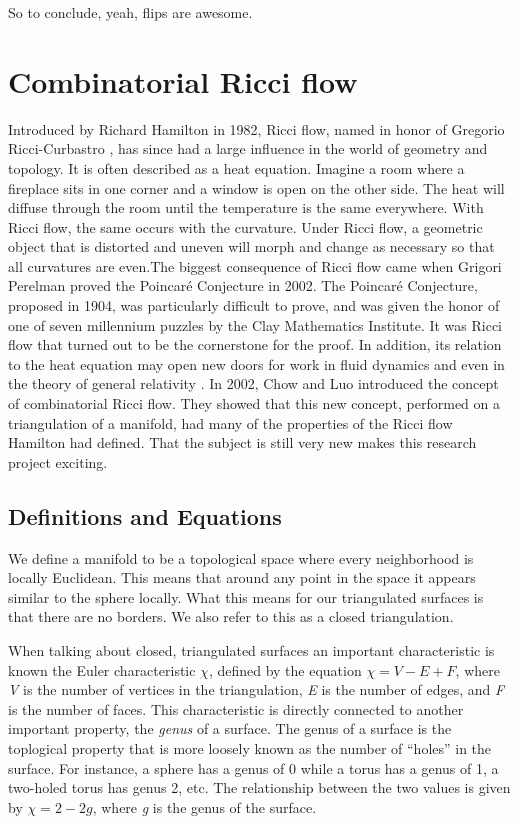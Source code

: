 \documentclass[12pt]{article}
\begin{document}
\noindent So to conclude, yeah, flips are awesome. 

\section{Combinatorial Ricci flow}
\label{RBk}

Introduced by Richard Hamilton in 1982, Ricci flow, named in honor of Gregorio Ricci-Curbastro \cite{RicciBkgd}, has since had a large influence in the world of geometry and topology. It is often described as a heat equation. Imagine a room where a fireplace sits in one corner and a window is open on the other side. The heat will diffuse through the room until the temperature is the same everywhere. With Ricci flow, the same occurs with the curvature. Under Ricci flow, a geometric object that is distorted and uneven will morph and change as necessary so that all curvatures are even.The biggest consequence of Ricci flow came when Grigori Perelman proved the Poincar\'{e} Conjecture in 2002. The Poincar\'{e} Conjecture, proposed in 1904, was particularly difficult to prove, and was given the honor of one of seven millennium puzzles by the Clay Mathematics Institute. It was Ricci flow that turned out to be the cornerstone for the proof. In addition, its relation to the heat equation may open new doors for work in fluid dynamics and even in the theory of general relativity \cite{RicciBkgd}. In 2002, Chow and Luo introduced the concept of combinatorial Ricci flow. They showed that this new concept, performed on a triangulation of a manifold, had many of the properties of the Ricci flow Hamilton had defined. That the subject is still very new makes this research project exciting. \newline

\subsection{Definitions and Equations}
We define a manifold to be a topological space where every neighborhood is locally Euclidean. This means that around any point in the space it appears similar to the sphere locally. What this means for our triangulated surfaces is that there are no borders. We also refer to this as a closed triangulation.\newline


\noindent When talking about closed, triangulated surfaces an important characteristic is known the Euler characteristic $\chi$, defined by the equation $\chi = V - E + F$, where \textit{V} is the number of vertices in the triangulation, \textit{E} is the number of edges, and \textit{F} is the number of faces. This characteristic is directly connected to another important property, the \textit{genus} of a surface. The genus of a surface is the toplogical property that is more loosely known as the number of ``holes'' in the surface. For instance, a sphere has a genus of 0 while a torus has a genus of 1, a two-holed torus has genus 2, etc. The relationship between the two values is given by $\chi = 2 - 2g$, where \textit{g} is the genus of the surface.\newline 
\end{document}
